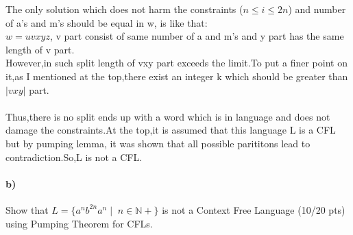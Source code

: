 \documentclass[a4paper,12pt]{article}
\begin{document}
\begin{tcolorbox}
The only solution which does not harm the constraints ($n\leq i \leq 2n$) and number of a's and m's should be equal in w, is like that:\\
$w=uvxyz$, v part consist of same number of a and m's and y part has the same length of v part.\\However,in such split length of vxy part exceeds the limit.To put a finer point on it,as I mentioned at the top,there exist an integer k which should be  greater than $|vxy|$ part.\\\\

Thus,there is no split ends up with a word which is in language and does not damage the constraints.At the top,it is assumed that this language L is a CFL but by pumping lemma, it was shown  that all possible parititons lead to contradiction.So,L is not a CFL.\\     

\end{tcolorbox}

\newpage

\paragraph{b)} Show that $L=\{a^n b^{2n} a^n \mid \; n \in \mathbb{N+} \}$ is not a Context Free Language \hfill \small{(10/20 pts)} \\
using Pumping Theorem for CFLs. \\
\end{document}
